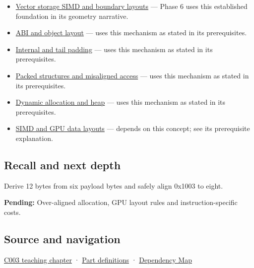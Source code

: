 \begin{itemize}
\item
  \hyperref[appendix-26bf6bf2fb8b]{Vector storage SIMD and boundary layouts} --- Phase 6 uses this established foundation in its geometry narrative.
\item
  \hyperref[appendix-c4ac6bb0fff8]{ABI and object layout} --- uses this mechanism as stated in its prerequisites.
\item
  \hyperref[appendix-f52f8c5a3afd]{Internal and tail padding} --- uses this mechanism as stated in its prerequisites.
\item
  \hyperref[appendix-0682dbfc5f0e]{Packed structures and misaligned access} --- uses this mechanism as stated in its prerequisites.
\item
  \hyperref[appendix-c3480f7d9ff3]{Dynamic allocation and heap} --- uses this mechanism as stated in its prerequisites.
\item
  \hyperref[appendix-3c7b1a56de01]{SIMD and GPU data layouts} --- depends on this concept; see its prerequisite explanation.
\end{itemize}

\subsection{Recall and next depth}\label{appendix-a1f7c53b4742-recall-and-next-depth}

Derive 12 bytes from six payload bytes and safely align 0x1003 to eight.

\textbf{Pending:} Over-aligned allocation, GPU layout rules and instruction-specific costs.

\subsection{Source and navigation}\label{appendix-a1f7c53b4742-source-and-navigation}

\hyperref[01-foundations-i-ch002-where-the-bytes-live]{C003 teaching chapter} · \hyperref[appendix-fd090d982a15-m003---parts-41-60]{Part definitions} · \hyperref[appendix-4ad47bdd269a]{Dependency Map}
